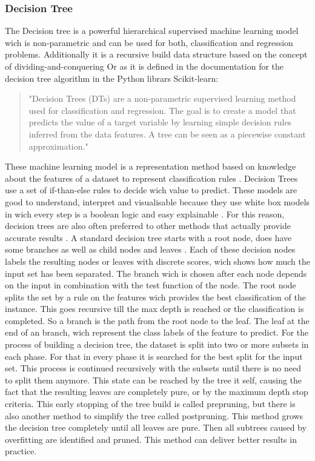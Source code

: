 \documentclass[../masterarbeit.tex]{subfiles}
\begin{document}
\subsubsection{Decision Tree}
The Decision tree is a powerful hierarchical supervised machine learning model wich is non-parametric and can be used for both, classification and regression problems. Additionally it is a recursive build data structure based on the concept of dividing-and-conquering \textcite[]{SUBASI202091}
 Or as it is defined in the documentation for the decision tree algorithm in the Python librars Scikit-learn: 
\begin{quote}
	"Decision Trees (DTs) are a non-parametric supervised learning method used for classification and regression. The goal is to create a model that predicts the value of a target variable by learning simple decision rules inferred from the data features. A tree can be seen as a piecewise constant approximation." \autocite{Scikit-learn-decision-tree:2022}
\end{quote}
These machine learning model is a representation method based on knowledge about the features of a dataset to represent classification rules \textcite[]{SUGUMARAN2007930}. 
Decision Trees use a set of if-than-else rules to decide wich value to predict. These models are good to understand, interpret and visualisable because they use white box models in wich every step is a boolean logic and easy explainable \textcite[]{Scikit-learn-decision-tree:2022}. For this reason, decision trees are also often preferred to other methods that actually provide accurate results \textcite[]{SUBASI202091}.
A standard decision tree starts with a root node, does have some branches as well as child nodes and leaves \textcite[]{SUGUMARAN2007930}. Each of these decision nodes labels the resulting nodes or leaves with discrete scores, wich shows how much the input set has been separated. The branch wich is chosen after each node depends on the input in combination with the test function of the node. \autocite[]{SUBASI202091} 
The root node splits the set by a rule on the features wich provides the best classification of the instance. This goes recursive till the max depth is reached or the classification is completed. So a branch is the path from the root node to the leaf. The leaf at the end of an branch, wich represent the class labels of the feature to predict. \autocite[]{SUGUMARAN2007930}
For the process of building a decision tree, the dataset is split into two or more subsets in each phase. For that in every phase it is searched for the best split for the input set. This process is continued recursively with the subsets until there is no need to split them anymore. This state can be reached by the tree it self, causing the fact that the resulting leaves are completely pure, or by the maximum depth stop criteria. This early stopping of the tree build is called prepruning, but there is also another method to simplify the tree called postpruning. This method grows the decision tree completely until all leaves are pure. Then all subtrees caused by overfitting are identified and pruned. This method can deliver better results in practice. \autocite[]{SUBASI202091}
\end{document}

